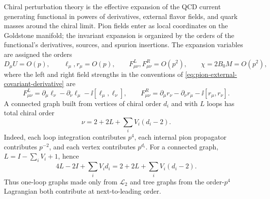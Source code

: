 Chiral perturbation theory is the effective expansion of the QCD current
generating functional in powers of derivatives, external flavor fields, and
quark masses around the chiral limit.  Pion fields enter as local coordinates
on the Goldstone manifold; the invariant expansion is organized by the orders
of the functional's derivatives, sources, and spurion insertions.  The
expansion variables are assigned the orders
\[
  D_\mu U=O(p),\qquad
  \ell_\mu,r_\mu=O(p),\qquad
  F^L_{\mu\nu},F^R_{\mu\nu}=O(p^2),\qquad
  \chi=2B_0M=O(p^2),
\]
where the left and right field strengths in the conventions of
\eqref{eq:pion-external-covariant-derivative} are
\[
  F^L_{\mu\nu}
  =
  \partial_\mu\ell_\nu-\partial_\nu\ell_\mu
  -\ii[\ell_\mu,\ell_\nu],
  \qquad
  F^R_{\mu\nu}
  =
  \partial_\mu r_\nu-\partial_\nu r_\mu
  -\ii[r_\mu,r_\nu].
\]
A connected graph built from vertices of chiral order \(d_i\) and with \(L\)
loops has total chiral order
\begin{equation}
  \nu
  =
  2+2L+\sum_i V_i(d_i-2).
  \label{eq:weinberg-chiral-power-counting}
\end{equation}
Indeed, each loop integration contributes \(p^4\), each internal pion
propagator contributes \(p^{-2}\), and each vertex contributes \(p^{d_i}\).
For a connected graph, \(L=I-\sum_iV_i+1\), hence
\[
  4L-2I+\sum_i V_id_i
  =
  2+2L+\sum_iV_i(d_i-2).
\]
Thus one-loop graphs made only from \(\mathcal L_2\) and tree graphs from the
order-\(p^4\) Lagrangian both contribute at next-to-leading order.

